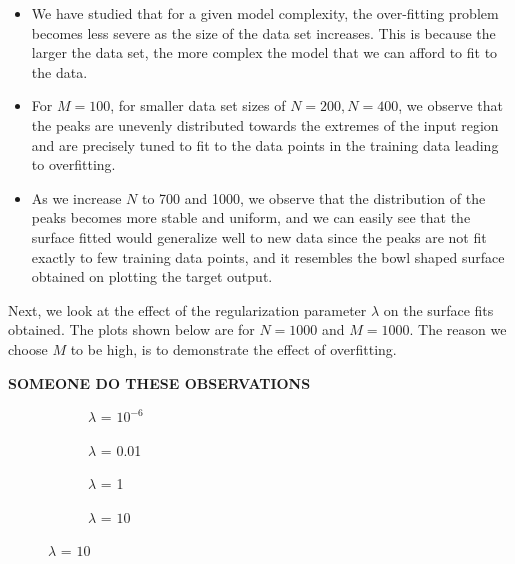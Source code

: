 \documentclass{article}
\begin{document}
\begin{itemize}
\item We have studied that for a given model complexity, the over-fitting problem becomes less severe as the size of the data set increases. This is because the larger the data set, the more complex the model that we can afford to fit to the data.
\item For $M=100$, for smaller data set sizes of $N=200, N=400$, we observe that the peaks are unevenly distributed towards the extremes of the input region and are precisely tuned to fit to the data points in the training data leading to overfitting.
\item As we increase $N$ to 700 and 1000, we observe that the distribution of the peaks becomes more stable and uniform, and we can easily see that the surface fitted would generalize well to new data since the peaks are not fit exactly to few training data points, and it resembles the bowl shaped surface obtained on plotting the target output.
\end{itemize}

\begin{flushleft}
Next, we look at the effect of the regularization parameter $\lambda$ on the surface fits obtained. The plots shown below are for $N = 1000$ and $M = 1000$. The reason we choose $M$ to be high, is to demonstrate the effect of overfitting.


\textbf{SOMEONE DO THESE OBSERVATIONS}


\end{flushleft}

\begin{figure}[H]

\begin{subfigure}{.5\textwidth}
\centering
\caption{$\lambda$ = $10^{-6}$}
\end{subfigure}
\begin{subfigure}{.5\textwidth}
\caption{$\lambda$ = 0.01}
\end{subfigure}


\begin{subfigure}{.5\textwidth}
\centering
\caption{$\lambda$ = 1}
\end{subfigure}
\begin{subfigure}{.5\textwidth}
\caption{$\lambda$ = $10$}
\end{subfigure}



\end{figure}
\end{document}
